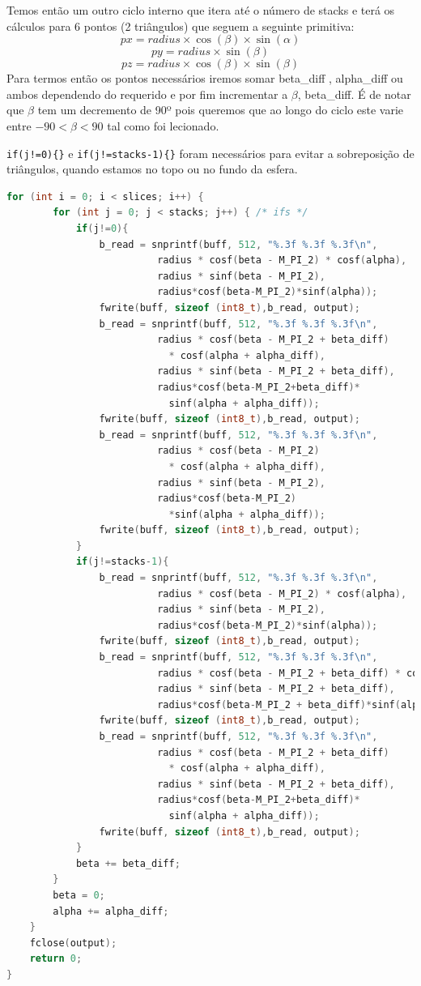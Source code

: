 \documentclass[14pt, a4 paper]{article}
\begin{document}
Temos então um outro ciclo interno que itera até o número de stacks e terá os cálculos para 6 pontos (2 triângulos) que seguem a seguinte primitiva:
$$
px= radius \times \cos(\beta) \times \sin(\alpha)
$$
$$
py= radius \times \sin(\beta)
$$
$$
pz= radius \times \cos(\beta) \times \sin(\beta)
$$
Para termos então os pontos necessários iremos somar beta\_diff , alpha\_diff ou ambos dependendo do requerido e por fim incrementar a $\beta$, beta\_diff. É de notar que $\beta$ tem um decremento de 90º pois queremos que ao longo do ciclo este varie entre $-90<\beta<90$ tal como foi lecionado.

\verb|if(j!=0){}| e \verb|if(j!=stacks-1){}| foram necessários para evitar a sobreposição de triângulos, quando estamos no topo ou no fundo da esfera.

\begin{lstlisting}[language = c++]
	for (int i = 0; i < slices; i++) {
		for (int j = 0; j < stacks; j++) { /* ifs */
			if(j!=0){
				b_read = snprintf(buff, 512, "%.3f %.3f %.3f\n",
						  radius * cosf(beta - M_PI_2) * cosf(alpha),
						  radius * sinf(beta - M_PI_2),
						  radius*cosf(beta-M_PI_2)*sinf(alpha));
				fwrite(buff, sizeof (int8_t),b_read, output);
				b_read = snprintf(buff, 512, "%.3f %.3f %.3f\n",
						  radius * cosf(beta - M_PI_2 + beta_diff)
							* cosf(alpha + alpha_diff),
						  radius * sinf(beta - M_PI_2 + beta_diff),
						  radius*cosf(beta-M_PI_2+beta_diff)*
							sinf(alpha + alpha_diff));
				fwrite(buff, sizeof (int8_t),b_read, output);
				b_read = snprintf(buff, 512, "%.3f %.3f %.3f\n",
						  radius * cosf(beta - M_PI_2)
							* cosf(alpha + alpha_diff),
						  radius * sinf(beta - M_PI_2),
						  radius*cosf(beta-M_PI_2)
							*sinf(alpha + alpha_diff));
				fwrite(buff, sizeof (int8_t),b_read, output);
			}
			if(j!=stacks-1){
				b_read = snprintf(buff, 512, "%.3f %.3f %.3f\n",
						  radius * cosf(beta - M_PI_2) * cosf(alpha),
						  radius * sinf(beta - M_PI_2),
						  radius*cosf(beta-M_PI_2)*sinf(alpha));
				fwrite(buff, sizeof (int8_t),b_read, output);
				b_read = snprintf(buff, 512, "%.3f %.3f %.3f\n",
						  radius * cosf(beta - M_PI_2 + beta_diff) * cosf(alpha),
						  radius * sinf(beta - M_PI_2 + beta_diff),
						  radius*cosf(beta-M_PI_2 + beta_diff)*sinf(alpha));
				fwrite(buff, sizeof (int8_t),b_read, output);
				b_read = snprintf(buff, 512, "%.3f %.3f %.3f\n",
						  radius * cosf(beta - M_PI_2 + beta_diff)
							* cosf(alpha + alpha_diff),
						  radius * sinf(beta - M_PI_2 + beta_diff),
						  radius*cosf(beta-M_PI_2+beta_diff)*
							sinf(alpha + alpha_diff));
				fwrite(buff, sizeof (int8_t),b_read, output);
			}
			beta += beta_diff;
		}
		beta = 0;
		alpha += alpha_diff;
	}
	fclose(output);
	return 0;
}
\end{lstlisting}
\end{document}
